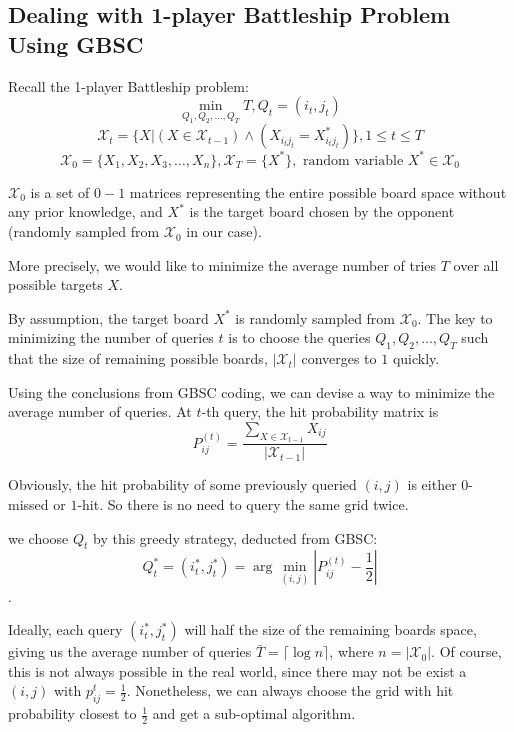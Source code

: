 \subsection{Dealing with 1-player Battleship Problem Using GBSC}
Recall the 1-player Battleship problem:
$$    \min_{Q_1, Q_2, \dots, Q_T} T  , Q_t = (i_t, j_t)$$
$$    \mathcal{X}_t = \{X|(X\in \mathcal{X}_{t-1}) \wedge (X_{i_t j_t} = X^{*}_{i_t j_t})\} , 1 \leq t \leq T$$
$$\mathcal{X}_0 = \{ X_1, X_2, X_3, \dots, X_n \},	\mathcal{X}_T = \{X^{*}\}, \text{ random variable } X^* \in \mathcal{X}_0 $$

$\mathcal{X}_0$ is a set of $0-1$ matrices representing the entire possible board space without any prior knowledge, and $X^*$ is the target board chosen by the opponent (randomly sampled from $\mathcal{X}_0$ in our case).

More precisely, we would like to minimize the average number of tries $T$ over all possible targets $X$.

By assumption, the target board $X^{*}$ is randomly sampled from $\mathcal{X}_0$. The key to minimizing the number of queries $t$ is to choose the queries $Q_1, Q_2, \dots, Q_T$ such that the size of remaining possible boards, $|\mathcal X_{t}|$ converges to $1$ quickly. 

Using the conclusions from GBSC coding, we can devise a way to minimize the average number of queries.
At $t$-th query, the hit probability matrix is 
$$P^{(t)}_{ij} = \frac{\sum_{X \in \mathcal{X}_{t-1}} X_{ij}}{|\mathcal{X}_{t-1}|}   $$

Obviously, the hit probability of some previously queried $(i,j)$ is either $0$-missed or $1$-hit. So there is no need to query the same grid twice.

we choose $Q_t$ by this greedy strategy, deducted from GBSC:
$$Q^*_t=(i^*_t, j^*_t) = \arg\min_{(i,j)} |P^{(t)}_{ij} - \frac{1}{2}| $$.

Ideally, each query $(i^*_t, j^*_t)$ will half the size of the remaining boards space, giving us the average number of queries $\bar{T} = \lceil \log n \rceil$, where $n = |\mathcal{X}_0|$. Of course, this is not always possible in the real world, since there may not be exist a $(i,j)$ with $p^t_{ij} = \frac{1}{2}$. Nonetheless, we can always choose the grid with hit probability closest to $\frac{1}{2}$ and get a sub-optimal algorithm.

